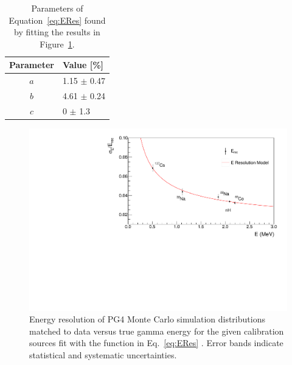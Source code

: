 \newpage

\begin{table}[H]
	\centering
\begin{tabular}{c|l}
	\hline 
	\textbf{Parameter} & \textbf{Value [\%]} \\ 
	\hline 
	$a$ & 1.15 $\pm$ 0.47 \\ 
	$b$ & 4.61 $\pm$ 0.24 \\ 
	$c$ & 0 $\pm$ 1.3 \\ 
	\hline 
\end{tabular} 
\caption{Parameters of Equation~\ref{eq:ERes} found by fitting the results in Figure~\ref{fig:gammares}.}
\label{tab:MCResValues}
\end{table}

\begin{figure}[H]
	\centering
	\includegraphics[width=0.8\linewidth]{tex/5-analysis-images/GammaRes}
	\caption{Energy resolution of PG4 Monte Carlo simulation distributions matched to data versus true gamma energy for the given calibration sources fit with the function in Eq.~\ref{eq:ERes} \cite{XZhang:2815}. Error bands indicate statistical and systematic uncertainties.}
	\label{fig:gammares}
\end{figure}



